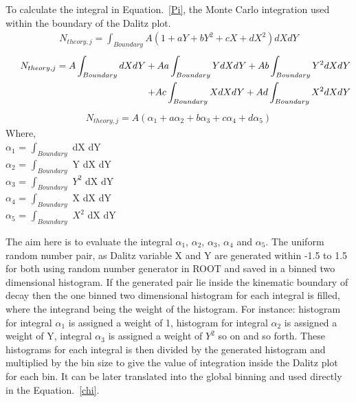To calculate the integral in Equation.~\ref{Pi}, the Monte Carlo integration used within the boundary of the Dalitz plot. 
\begin{eqnarray}
N_{theory,j} = \int_{Boundary} A(1 + aY + b Y^{2} + cX + d X^{2}) dX dY
\label{Pi}
\end{eqnarray}
\begin{eqnarray*}
\begin{split}
\indent
N_{theory,j} = A \int_{Boundary} dX dY + A a \int_{Boundary} Y dX dY 
+ A b \int_{Boundary} Y^{2} dX dY \\ + A c \int_{Boundary} X dX dY 
+ A d \int_{Boundary} X^{2} dX dY 
\end{split}
\end{eqnarray*}
\begin{eqnarray*}
N_{theory,j} = A ( \alpha_{1} + a \alpha_{2} + b \alpha_{3} + c \alpha_{4} + d \alpha_{5})
\end{eqnarray*}
\noindent
Where,  
\indent
\\ $\alpha_{1}$ = $\int_{Boundary}$ dX dY
\indent
\\ $\alpha_{2}$ = $\int_{Boundary}$ Y dX dY
\indent
\\ $\alpha_{3}$ = $\int_{Boundary}$ $Y^{2}$ dX dY
\indent
\\ $\alpha_{4}$ = $\int_{Boundary}$ X dX dY
\indent
\\ $\alpha_{5}$ = $\int_{Boundary}$ $X^{2}$ dX dY

The aim here is to evaluate the integral $\alpha_{1}$, $\alpha_{2}$, $\alpha_{3}$, $\alpha_{4}$ and $\alpha_{5}$. The uniform random number pair, as Dalitz variable X and Y are generated within -1.5 to 1.5 for both using random number generator in ROOT and saved in a binned two dimensional histogram. If the generated pair lie inside the kinematic boundary of decay then the one binned two dimensional histogram for each integral is filled, where the integrand being the weight of the histogram.
For instance:  histogram for integral $\alpha_{1}$ is assigned a weight of 1, histogram for integral $\alpha_{2}$ is assigned a weight of Y, integral $\alpha_{3}$ is assigned a weight of $Y^{2}$ so on and so forth. These histograms for each integral is then divided by the generated histogram and multiplied by the bin size to give the value of integration inside the Dalitz plot for each bin. It can be later translated into the global binning and used directly in the Equation.~\ref{chi}.





